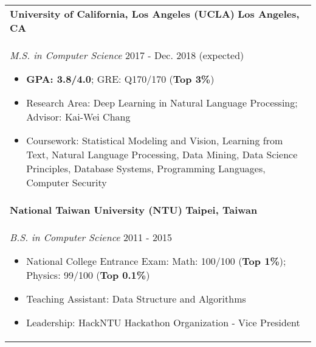 \documentclass[letterpaper,11pt]{article} %
\begin{document}
{%
\begin{tabular}{p{18.5cm}}
{\bf{University of California, Los Angeles (UCLA)}}  \hfill \bf{Los Angeles, CA}\\
{\it M.S. in Computer Science} \hfill  2017 - Dec. 2018 (expected)
\begin{itemize}
\item \textbf{GPA: 3.8/4.0}; GRE: Q170/170 (\textbf{Top 3\%})
\item Research Area: Deep Learning in Natural Language Processing; Advisor: Kai-Wei Chang 
\item Coursework: Statistical Modeling and Vision, Learning from Text, Natural Language Processing, Data Mining, Data Science Principles, Database Systems, Programming Languages, Computer Security 
\vspace*{-\baselineskip}%
\end{itemize}\\ 
\vspace{.1mm}
%
{\bf{National Taiwan University (NTU)}} \hfill \bf{Taipei, Taiwan}\\
{\it B.S. in Computer Science} \hfill 2011 - 2015
\begin{itemize}
\item National College Entrance Exam:  Math: 100/100 (\textbf{Top 1\%}); Physics: 99/100 (\textbf{Top 0.1\%}) 
\item Teaching Assistant: Data Structure and Algorithms
\item Leadership: HackNTU Hackathon Organization - Vice President 
\vspace*{-\baselineskip}
\end{itemize} 
\end{tabular}

}
\end{document}
